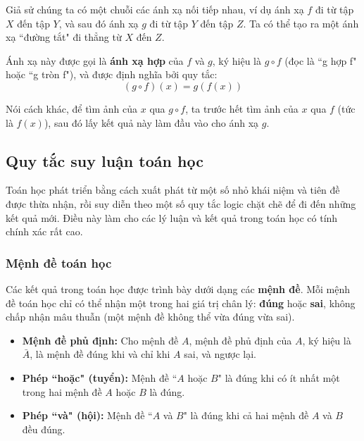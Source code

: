 \begin{definition}
    Giả sử chúng ta có một chuỗi các ánh xạ nối tiếp nhau, ví dụ ánh xạ $f$ đi từ tập $X$ đến tập $Y$, và sau đó ánh xạ $g$ đi từ tập $Y$ đến tập $Z$. Ta có thể tạo ra một ánh xạ ``đường tắt" đi thẳng từ $X$ đến $Z$.
    
    Ánh xạ này được gọi là \textbf{ánh xạ hợp} của $f$ và $g$, ký hiệu là $g \circ f$ (đọc là ``g hợp f" hoặc ``g tròn f"), và được định nghĩa bởi quy tắc:
    \[ (g \circ f)(x) = g(f(x)) \]
    
    Nói cách khác, để tìm ảnh của $x$ qua $g \circ f$, ta trước hết tìm ảnh của $x$ qua $f$ (tức là $f(x)$), sau đó lấy kết quả này làm đầu vào cho ánh xạ $g$.
\end{definition}



\subsection{Quy tắc suy luận toán học}

Toán học phát triển bằng cách xuất phát từ một số nhỏ khái niệm và tiên đề được thừa nhận, rồi suy diễn theo một số quy tắc logic chặt chẽ để đi đến những kết quả mới. Điều này làm cho các lý luận và kết quả trong toán học có tính chính xác rất cao.

\subsubsection{Mệnh đề toán học}

Các kết quả trong toán học được trình bày dưới dạng các \textbf{mệnh đề}. Mỗi mệnh đề toán học chỉ có thể nhận một trong hai giá trị chân lý: \textbf{đúng} hoặc \textbf{sai}, không chấp nhận mâu thuẫn (một mệnh đề không thể vừa đúng vừa sai).

\begin{itemize}
    \item \textbf{Mệnh đề phủ định:} Cho mệnh đề $A$, mệnh đề phủ định của $A$, ký hiệu là $\bar{A}$, là mệnh đề đúng khi và chỉ khi $A$ sai, và ngược lại.
    \item \textbf{Phép ``hoặc" (tuyển):} Mệnh đề ``$A$ hoặc $B$" là đúng khi có ít nhất một trong hai mệnh đề $A$ hoặc $B$ là đúng.
    \item \textbf{Phép ``và" (hội):} Mệnh đề ``$A$ và $B$" là đúng khi cả hai mệnh đề $A$ và $B$ đều đúng.
\end{itemize}

